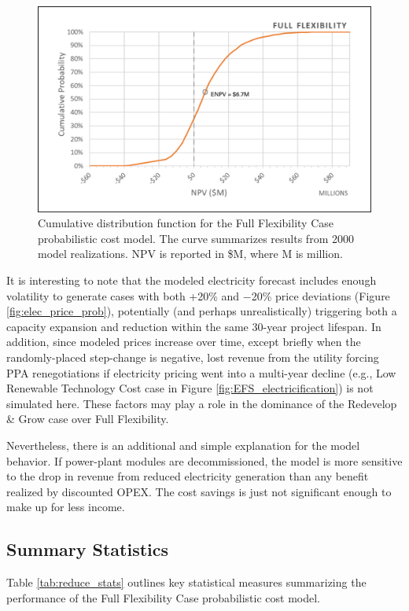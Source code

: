 \begin{figure}
\centering
\includegraphics[width=.8\textwidth]{templates/images/Figure-Reduce_Case_CDF.png}
\caption[Full Flexibility Case CDF]{Cumulative distribution function for the Full Flexibility Case probabilistic cost model. The curve summarizes results from 2000 model realizations. NPV is reported in \$M, where M is million.}
\label{fig:reduce_case_cdf}
\end{figure}

It is interesting to note that the modeled electricity forecast includes enough volatility to generate cases with both +20\% and $-$20\% price deviations (Figure \ref{fig:elec_price_prob}), potentially (and perhaps unrealistically) triggering both a capacity expansion and reduction within the same 30-year project lifespan. In addition, since modeled prices increase over time, except briefly when the randomly-placed step-change is negative, lost revenue from the utility forcing PPA renegotiations if electricity pricing went into a multi-year decline (e.g., Low Renewable Technology Cost case in Figure \ref{fig:EFS_electricification}) is not simulated here. These factors may play a role in the dominance of the Redevelop \& Grow case over Full Flexibility.

Nevertheless, there is an additional and simple explanation for the model behavior. If power-plant modules are decommissioned, the model is more sensitive to the drop in revenue from reduced electricity generation than any benefit realized by discounted OPEX. The cost savings is just not significant enough to make up for less income.

\subsection{Summary Statistics}\label{ch6:reduce_stats}
Table \ref{tab:reduce_stats} outlines key statistical measures summarizing the performance of the Full Flexibility Case probabilistic cost model.

